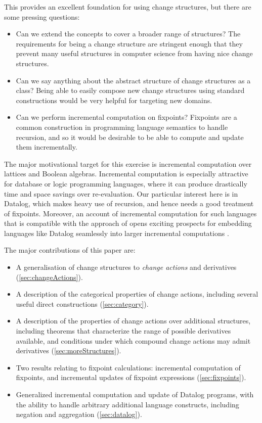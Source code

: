 This provides an excellent foundation for using change structures, but there are
some pressing questions:
\begin{itemize}
  \item Can we extend the concepts to cover a broader range of structures?
    The requirements for being a change structure are stringent enough that they
    prevent many useful structures in computer science from having nice change structures.
  \item Can we say anything about the abstract structure of change structures as
    a class? Being able to easily compose new change structures using standard
    constructions would be very helpful for targeting new domains.
  \item Can we perform incremental computation on fixpoints? Fixpoints are a
    common construction in programming language semantics to handle recursion,
    and so it would be desirable to be able to compute and update them incrementally.
\end{itemize}

The major motivational target for this exercise is incremental computation over
lattices and Boolean algebras. Incremental computation is especially attractive
for database or logic programming languages, where it can
produce drastically time and space savings over re-evaluation. Our particular
interest here is in Datalog, which makes heavy use of recursion, and hence needs
a good treatment of fixpoints. Moreover, an
account of incremental computation for such languages that is compatible with
the approach of \textcite{cai2014changes} opens exciting prospects for embedding
languages like Datalog seamlessly into larger incremental computations
\autocite[See][]{arntz2016datafun}.

The major contributions of this paper are:
\begin{itemize}
  \item A generalisation of change structures to \textit{change actions} and derivatives
    (\cref{sec:changeActions}).
  \item A description of the categorical properties of change actions, including
    several useful direct constructions (\cref{sec:category}).
  \item A description of the properties of change actions over 
    additional structures, including theorems that characterize the range of
    possible derivatives available, and conditions under which compound change
    actions may admit derivatives (\cref{sec:moreStructures}).
  \item Two results relating to fixpoint calculations: incremental computation
    of fixpoints, and incremental updates of fixpoint expressions (\cref{sec:fixpoints}).
  \item Generalized incremental computation and
    update of Datalog programs, with the ability to handle arbitrary additional
    language constructs, including negation and aggregation (\cref{sec:datalog}).
\end{itemize}

